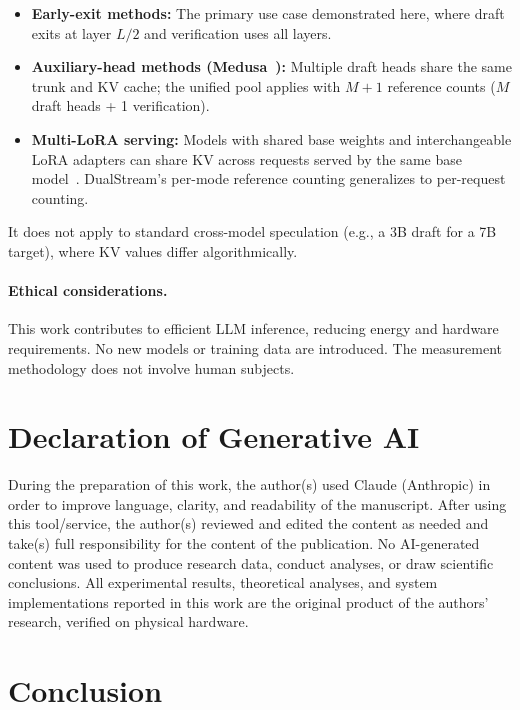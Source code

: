 \documentclass[review]{elsarticle}
\theoremstyle{definition}
\theoremstyle{remark}
\begin{document}
\begin{itemize}
    \item \textbf{Early-exit methods:} The primary use case demonstrated
    here, where draft exits at layer $L/2$ and verification uses all layers.
    \item \textbf{Auxiliary-head methods (Medusa~\cite{medusa2024}):}
    Multiple draft heads share the same trunk and KV cache; the unified pool
    applies with $M+1$ reference counts ($M$ draft heads + 1 verification).
    \item \textbf{Multi-LoRA serving:} Models with shared base weights and
    interchangeable LoRA adapters can share KV across requests served by
    the same base model~\cite{droidspeak2026}. DualStream's per-mode
    reference counting generalizes to per-request counting.
\end{itemize}

It does not apply to standard cross-model speculation (e.g., a 3B draft
for a 7B target), where KV values differ algorithmically.

\paragraph{Ethical considerations.}
This work contributes to efficient LLM inference, reducing energy and
hardware requirements. No new models or training data are introduced.
The measurement methodology does not involve human subjects.

\section*{Declaration of Generative AI}
\label{sec:ai-declaration}

During the preparation of this work, the author(s) used Claude (Anthropic)
in order to improve language, clarity, and readability of the manuscript.
After using this tool/service, the author(s) reviewed and edited the content
as needed and take(s) full responsibility for the content of the publication.
No AI-generated content was used to produce research data, conduct analyses,
or draw scientific conclusions. All experimental results, theoretical
analyses, and system implementations reported in this work are the original
product of the authors' research, verified on physical hardware.

\section{Conclusion}
\end{document}
